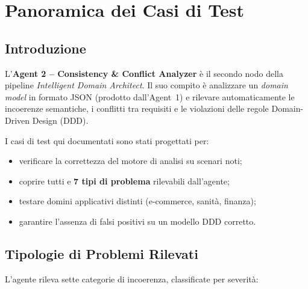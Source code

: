 \documentclass[12pt,a4paper]{report}
\begin{document}
\tableofcontents
\clearpage

\chapter{Panoramica dei Casi di Test}

\section{Introduzione}

L'\textbf{Agent 2 -- Consistency \& Conflict Analyzer} è il secondo nodo della pipeline
\textit{Intelligent Domain Architect}. Il suo compito è analizzare un \textit{domain model}
in formato JSON (prodotto dall'Agent~1) e rilevare automaticamente le incoerenze
semantiche, i conflitti tra requisiti e le violazioni delle regole Domain-Driven Design (DDD).

I casi di test qui documentati sono stati progettati per:
\begin{itemize}
  \item verificare la correttezza del motore di analisi su scenari noti;
  \item coprire tutti e \textbf{7 tipi di problema} rilevabili dall'agente;
  \item testare domini applicativi distinti (e-commerce, sanità, finanza);
  \item garantire l'assenza di falsi positivi su un modello DDD corretto.
\end{itemize}
\clearpage
\section{Tipologie di Problemi Rilevati}

L'agente rileva sette categorie di incoerenza, classificate per severità:
\end{document}
